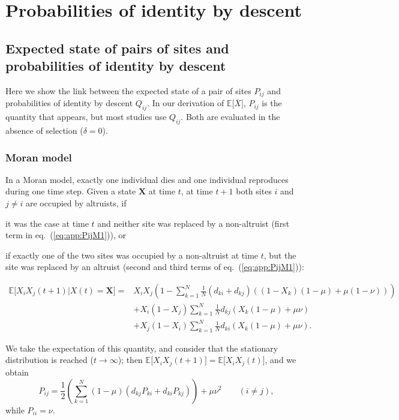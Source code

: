 \documentclass[11pt, letterpaper]{article}
\renewcommand{\eqref}[1]{\textup{{\normalfont eq.~(\ref{#1}}\normalfont)}}
\newcommand{\Esp}[1]{\mathbb{E}\big[ #1\big]}%
\newcommand{\mutbias}{\nu}
\newcommand{\selstr}{\delta}
\begin{document}
\section{Probabilities of identity by descent}
\subsection{Expected state of pairs of sites and probabilities of identity by descent\label{sec:app:IBD}}

Here we show the link between the expected state of a pair of sites $P_{ij}$ and probabilities of identity by descent $Q_{ij}$. In our derivation of $\Esp{\overline{X}}$, $P_{ij}$ is the quantity that appears, but most studies use $Q_{ij}$. Both are evaluated in the absence of selection ($\selstr = 0$). 

\subsubsection{Moran model}
In a Moran model, exactly one individual dies and one individual reproduces during one time step. Given a state $\mathbf{X}$ at time $t$, at time $t+1$ both sites $i$ and $j\neq i$ are occupied by altruists, if \begin{inparaenum}[\it i\rm)]\item it was the case at time $t$ and neither site was replaced by a non-altruist (first term in \eqref{eq:app:PijM1}), or \item if exactly one of the two sites was occupied by a non-altruist at time $t$, but the site was replaced by an altruist (second and third terms of \eqref{eq:app:PijM1}): \end{inparaenum}
%
\begin{align}\label{eq:app:PijM1}
 \Esp{X_iX_j(t+1)|X(t)=\mathbf{X}} = & X_i X_j \left(1 - \sum_{k=1}^N \frac{1}{N} \left( d_{ki} + d_{kj} \right) \left( (1-X_k) (1-\mu) + \mu (1-\mutbias)\right) \right) \nonumber \\
  &+ X_i (1-X_j) \sum_{k=1}^N \frac{1}{N} d_{kj} \left( X_k (1-\mu) + \mu \mutbias \right)  \\
& + X_j (1-X_i) \sum_{k=1}^N \frac{1}{N} d_{ki} \left( X_k (1-\mu) + \mu \mutbias \right). \nonumber
\end{align}

We take the expectation of this quantity, and consider that the stationary distribution is reached ($t\to \infty$); then $\Esp{X_iX_j(t+1)} = \Esp{X_i X_j (t)}$, and we obtain
%
\begin{equation}\label{eq:app:PijM}
P_{ij} = \frac{1}{2} \left(\sum_{k=1}^N (1-\mu) \left( d_{kj} P_{ki} + d_{ki} P_{kj}\right) \right) + \mu \mutbias^2 \qquad (i\neq j ),
\end{equation} 
while $P_{ii}=\mutbias$. 
\end{document}
